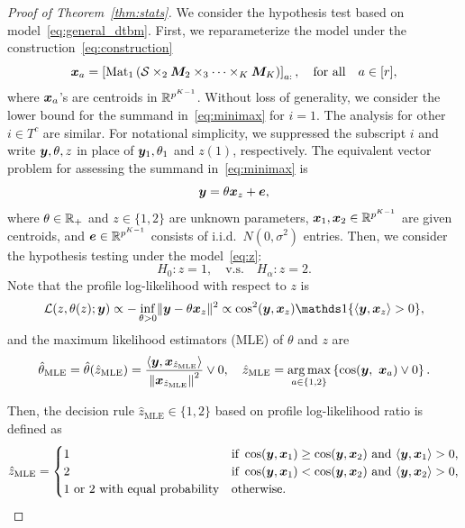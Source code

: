 \documentclass[lettersize,journal]{IEEEtran}
\theoremstyle{definition}
\theoremstyle{definition}
\newcommand{\of}[1]{\left(#1\right)}
\newcommand{\off}[1]{\left[#1\right]}
\newcommand{\offf}[1]{\left\{#1\right\}}
\begin{document}
\begin{proof}[Proof of Theorem~\ref{thm:stats}]
We consider the hypothesis test based on model~\eqref{eq:general_dtbm}. First, we reparameterize the model under the construction~\eqref{eq:construction}
\begin{equation}
    \mx_a = \off{\mat_1 \of{ \tS\times_2 \mM_2\times_3\cdots \times_K \mM_K  }}_{a:}, \quad \text{for all} \quad a \in [r],
\end{equation}
where $\bm x_a$'s are centroids in $\mathbb{R}^{p^{K-1}}$. Without loss of generality, we consider the lower bound for the summand in~\eqref{eq:minimax} for $i=1$. The analysis for other $i\in T^c$ are similar. For notational simplicity, we suppressed the subscript $i$ and write $\bm{y}, \theta, z$ in place of $\bm{y}_1, \theta_1$ and $z(1)$, respectively. The equivalent vector problem for assessing the summand in~\eqref{eq:minimax} is
\begin{equation}\label{eq:z}
\my=\theta\mx_{z}+\me,
\end{equation}
where $\theta\in\mathbb{R}_{+}$ and $z\in \{1,2\}$ are unknown parameters, $\bm x_1,\bm x_2\in\mathbb{R}^{p^{K-1}}$ are given centroids, and $\bm{e}\in\mathbb{R}^{p^{K-1}}$ consists of i.i.d.\ $N(0,\sigma^2)$ entries.  Then, we consider the hypothesis testing under the model~\eqref{eq:z}:
\begin{equation}\label{eq:test}
H_0\colon z=1, \quad \text{v.s.}\quad H_\alpha\colon z=2.
\end{equation}
Note that the profile log-likelihood with respect to $z$ is
\[
\tL(z,  \theta(z);\my)\propto - \inf_{\theta>0}\onormSize{}{\my- \theta\mx_{z}}^2 \propto  \cos^2(\my, \mx_{z}) \ind\{ \langle \my,\mx_{z}\rangle  >0 \}, 
\]
and the maximum likelihood estimators (MLE) of $\theta$ and $z$ are
\begin{equation}\label{eq:MLE}
    \hat \theta_{\text{MLE}}= \hat \theta(\hat z_{\text{MLE}})={\langle \my,\mx_{\hat z_{\text{MLE}}}\rangle \over \onorm{\mx_{\hat z_{\text{MLE}}}}^2}\vee 0 , \quad 
\hat z_{\text{MLE}}= \argmax_{a\in\{1,2\}} \offf{\cos(\my,\ \mx_a)\vee 0}. 
\end{equation}

Then, the decision rule $\hat z_{\text{MLE}} \in\{1,2\}$ based on profile log-likelihood ratio is defined as
\begin{equation}\label{eq:ratio}
\hat z_{\text{MLE}}=
\begin{cases}
1 & \text{if }\cos(\my,\mx_1)\geq  \cos(\my,\mx_2) \text{ and }\langle \my,\mx_1\rangle > 0, \\
2 & \text{if }\cos(\my,\mx_1)<\cos(\my,\mx_2) \text{ and }\langle \my,\mx_2\rangle > 0,\\
\text{1 or 2 with equal probability} & \text{otherwise.}
\end{cases}
\end{equation}


\end{proof}
\end{document}
